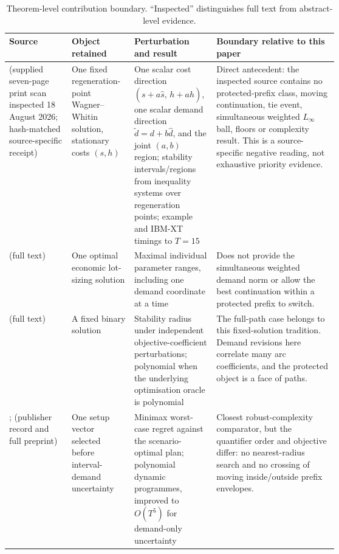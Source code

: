 \documentclass[11pt]{article}
\theoremstyle{definition}
\begin{document}
\begin{table}[t]
\centering
\caption{Theorem-level contribution boundary. ``Inspected'' distinguishes full text from abstract-level evidence.}
\label{tab:novelty}
\small
\begin{tabularx}{\linewidth}{@{}>{\raggedright\arraybackslash}p{0.19\linewidth}>{\raggedright\arraybackslash}p{0.19\linewidth}>{\raggedright\arraybackslash}p{0.25\linewidth}>{\raggedright\arraybackslash}X@{}}
\toprule
Source & Object retained & Perturbation and result & Boundary relative to this paper \\
\midrule
\textcite{RichterVoros1989} (supplied seven-page print scan inspected 18 August 2026; hash-matched source-specific receipt) & One fixed regeneration-point Wagner--Whitin solution, stationary costs $(s,h)$ & One scalar cost direction $(s+a\hat s,\,h+a\hat h)$, one scalar demand direction $\tilde d=d+b\hat d$, and the joint $(a,b)$ region; stability intervals/regions from inequality systems over regeneration points; example and IBM-XT timings to $T=15$ & Direct antecedent: the inspected source contains no protected-prefix class, moving continuation, tie event, simultaneous weighted $L_\infty$ ball, floors or complexity result. This is a source-specific negative reading, not exhaustive priority evidence. \\
\textcite{VanHoeselWagelmans1993} (full text) & One optimal economic lot-sizing solution & Maximal individual parameter ranges, including one demand coordinate at a time & Does not provide the simultaneous weighted demand norm or allow the best continuation within a protected prefix to switch. \\
\textcite{ChakravartiWagelmans1998} (full text) & A fixed binary solution & Stability radius under independent objective-coefficient perturbations; polynomial when the underlying optimisation oracle is polynomial & The full-path case belongs to this fixed-solution tradition. Demand revisions here correlate many arc coefficients, and the protected object is a face of paths. \\
\textcite{Zhang2011}; \textcite{LiRomeroMorales2013} (publisher record and full preprint) & One setup vector selected before interval-demand uncertainty & Minimax worst-case regret against the scenario-optimal plan; polynomial dynamic programmes, improved to $O(T^5)$ for demand-only uncertainty & Closest robust-complexity comparator, but the quantifier order and objective differ: no nearest-radius search and no crossing of moving inside/outside prefix envelopes. \\

\end{tabularx}
\end{table}
\end{document}
